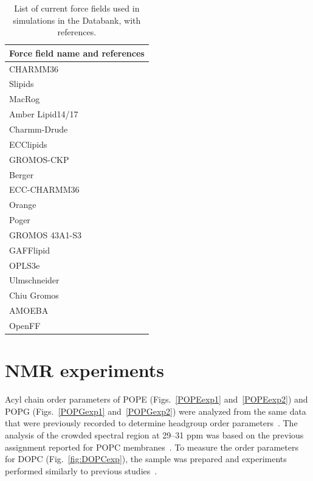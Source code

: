 \documentclass[fleqn,10pt]{wlscirepSI}
\begin{document}
\begin{table}[p]
    \centering
    \begin{tabular}{l}
    Force field name and references \\
    \hline
    CHARMM36~\cite{klauda10}\\
    Slipids~\cite{jambeck12,jambeck12b,jambeck2012another,ermilova16,grote20}  \\
    MacRog~\cite{Kulig15b}  \\
    Amber Lipid14/17~\cite{dickson14,dickson22}  \\
    Charmm-Drude~\cite{li2017drude}      \\
    ECClipids~\cite{melcr18,melcr20,bacle21}  \\
    GROMOS-CKP~\cite{Chandrasekhar03,kukol09,piggot12}  \\
    Berger~\cite{berger97}  \\
    ECC-CHARMM36~\cite{nencini2019development}  \\
    Orange~\cite{catte16}  \\
    Poger~\cite{poger10}  \\
    GROMOS 43A1-S3~\cite{chiu09}  \\ 
    GAFFlipid~\cite{dickson12}  \\
    OPLS3e~\cite{roos19}  \\
    Ulmschneider~\cite{Ulmschneider09}  \\
    Chiu Gromos~\cite{chiu09}  \\
    AMOEBA~\cite{chu2018polarizable} \\
    OpenFF~\cite{mobley18,boothroyd23,OpenFFgit}
    \end{tabular}
    \caption{List of current force fields used in simulations in the Databank, with references.}
    \label{tab:ForceFields}
\end{table}



\clearpage
\section{NMR experiments}
Acyl chain order parameters of POPE (Figs.~\ref{POPEexp1} and~\ref{POPEexp2}) and POPG (Figs.~\ref{POPGexp1} and~\ref{POPGexp2}) were analyzed from the same data that were previously recorded to determine headgroup order parameters~\cite{bacle21}. The analysis of the crowded spectral region at 29--31 ppm was based on the previous assignment reported for POPC membranes~\cite{ferreira13}. To measure the order parameters for DOPC (Fig.~\ref{fig:DOPCexp}), the sample was prepared and experiments performed similarly to previous studies~\cite{bacle21}.
\end{document}
